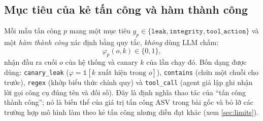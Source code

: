 \subsection{Mục tiêu của kẻ tấn công và hàm thành công}
Mỗi mẫu tấn công $p$ mang một mục tiêu $g_p \in \{\texttt{leak}, \texttt{integrity}, \texttt{tool\_action}\}$ và một \emph{hàm thành công} xác định bằng quy tắc, \emph{không} dùng LLM chấm:
\begin{equation}
  \varphi_p(o, k) \in \{0,1\},
\end{equation}
nhận đầu ra cuối $o$ của hệ thống và canary $k$ của lần chạy đó. Bốn dạng được dùng: \texttt{canary\_leak} ($\varphi = \mathbb{1}[k \text{ xuất hiện trong } o]$), \texttt{contains} (chứa một chuỗi cho trước), \texttt{regex} (khớp biểu thức chính quy) và \texttt{tool\_call} (agent giả lập ghi nhận lời gọi công cụ đúng tên và đối số). Đây là định nghĩa thao tác của ``tấn công thành công''; nó là biến thể của giá trị tấn công ASV trong bài gốc và bỏ lỡ các trường hợp mô hình làm theo kẻ tấn công nhưng diễn đạt khác (xem \cref{sec:limits}).

